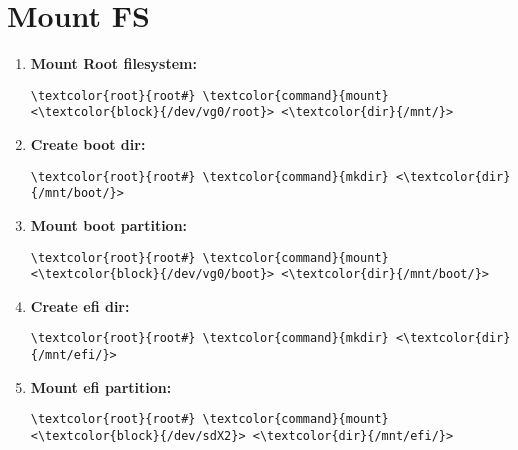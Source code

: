 \documentclass[10pt, a4paper, onecolumn, openany]{book} %
\begin{document}
\section{Mount FS}
\label{mount_fs}
\begin{enumerate}
    \item \textbf{Mount Root filesystem:}
\begin{Verbatim}[commandchars=\\\{\}]
\textcolor{root}{root#} \textcolor{command}{mount} <\textcolor{block}{/dev/vg0/root}> <\textcolor{dir}{/mnt/}>
\end{Verbatim}

    \item \textbf{Create boot dir:}
\begin{Verbatim}[commandchars=\\\{\}]
\textcolor{root}{root#} \textcolor{command}{mkdir} <\textcolor{dir}{/mnt/boot/}>
\end{Verbatim}

    \item \textbf{Mount boot partition:}
\begin{Verbatim}[commandchars=\\\{\}]
\textcolor{root}{root#} \textcolor{command}{mount} <\textcolor{block}{/dev/vg0/boot}> <\textcolor{dir}{/mnt/boot/}>
\end{Verbatim}

    \item \textbf{Create efi dir:}
\begin{Verbatim}[commandchars=\\\{\}]
\textcolor{root}{root#} \textcolor{command}{mkdir} <\textcolor{dir}{/mnt/efi/}>
\end{Verbatim}

    \item \textbf{Mount efi partition:}
\begin{Verbatim}[commandchars=\\\{\}]
\textcolor{root}{root#} \textcolor{command}{mount} <\textcolor{block}{/dev/sdX2}> <\textcolor{dir}{/mnt/efi/}>
\end{Verbatim}
\end{enumerate}
\end{document}
